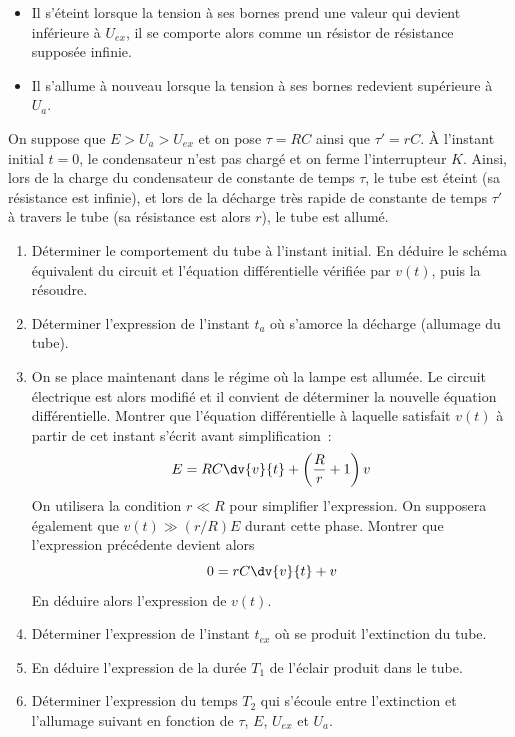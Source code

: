 \documentclass[a4paper, 10pt, garamond, oneside]{book}
\begin{document}
{\begin{itemize}
      résistance $r \ll R$.
    \item Il s'éteint lorsque la tension à ses bornes prend une valeur qui
      devient inférieure à $U_{ex}$, il se comporte alors comme un résistor de
      résistance supposée infinie.
    \item Il s'allume à nouveau lorsque la tension à ses bornes redevient
      supérieure à $U_{a}$.
  \end{itemize}
	On suppose que $E > U_{a}  > U_{ex}$ et on pose $\tau = RC$ ainsi que
	$\tau' = rC$. À l'instant initial $t = 0$, le condensateur n'est pas chargé
  et on ferme l'interrupteur $K$.
	\bigbreak
  Ainsi, lors de la charge du condensateur de constante de temps $\tau$,
  le tube est éteint (sa résistance est infinie), et lors de la décharge
  très rapide de constante de temps $\tau'$ à travers le tube (sa
  résistance est alors $r$), le tube est allumé.
	\begin{enumerate}
		\item Déterminer le comportement du tube à l'instant initial.
		      En déduire le schéma équivalent du circuit et l'équation
          différentielle vérifiée par $v(t)$, puis la résoudre.
		\item Déterminer l'expression de l'instant $t_{a}$ où s'amorce la décharge
          (allumage du tube).
		\item On se place maintenant dans le régime où la lampe est allumée.
          Le circuit électrique est alors modifié et il convient de déterminer
          la nouvelle équation différentielle. Montrer que l'équation
          différentielle à laquelle satisfait $v(t)$ à partir de cet instant
          s'écrit avant simplification~:
		      \[
			      E = RC \dv{v}{t} + \left(\frac{R}{r}+1\right) v
		      \]
		      \noindent
		      On utilisera la condition $r \ll R$ pour simplifier l'expression. On
          supposera également que $v(t) \gg (r/R)E$ durant cette phase. Montrer
          que l'expression précédente devient alors
		      \[
			      0 = rC \dv{v}{t} + v
		      \]
		      \noindent
		      En déduire alors l'expression de $v(t)$.
		\item Déterminer l'expression de l'instant $t_{ex}$ où se produit
          l'extinction du tube.
		\item En déduire l'expression de la durée $T_1$ de l'éclair produit dans le
          tube.
		\item Déterminer l'expression du temps $T_2$ qui s'écoule entre l'extinction
          et l'allumage suivant en fonction de $\tau$, $E$, $U_{ex}$  et $U_{a}$.

\end{enumerate}}
\end{document}
